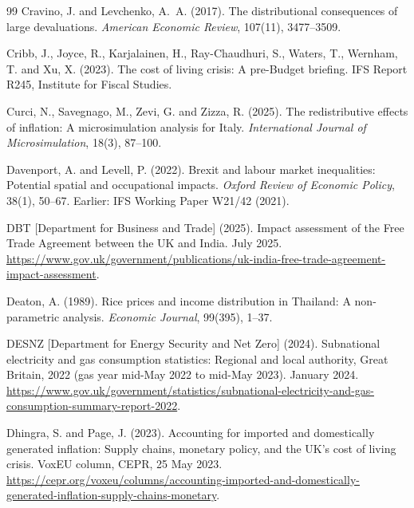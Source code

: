 \begin{thebibliography}{99}
Cravino, J. and Levchenko, A.~A. (2017).
\newblock The distributional consequences of large devaluations.
\newblock \emph{American Economic Review}, 107(11), 3477--3509.

Cribb, J., Joyce, R., Karjalainen, H., Ray-Chaudhuri, S., Waters, T., Wernham, T. and Xu, X. (2023).
\newblock The cost of living crisis: A pre-Budget briefing.
\newblock IFS Report R245, Institute for Fiscal Studies.

Curci, N., Savegnago, M., Zevi, G. and Zizza, R. (2025).
\newblock The redistributive effects of inflation: A microsimulation analysis for Italy.
\newblock \emph{International Journal of Microsimulation}, 18(3), 87--100.

Davenport, A. and Levell, P. (2022).
\newblock Brexit and labour market inequalities: Potential spatial and occupational impacts.
\newblock \emph{Oxford Review of Economic Policy}, 38(1), 50--67. Earlier: IFS Working Paper W21/42 (2021).

DBT [Department for Business and Trade] (2025).
\newblock Impact assessment of the Free Trade Agreement between the UK and India.
 July 2025. \url{https://www.gov.uk/government/publications/uk-india-free-trade-agreement-impact-assessment}.

Deaton, A. (1989).
\newblock Rice prices and income distribution in Thailand: A non-parametric analysis.
\newblock \emph{Economic Journal}, 99(395), 1--37.

DESNZ [Department for Energy Security and Net Zero] (2024).
\newblock Subnational electricity and gas consumption statistics: Regional and local authority, Great Britain, 2022 (gas year mid-May 2022 to mid-May 2023).
 January 2024. \url{https://www.gov.uk/government/statistics/subnational-electricity-and-gas-consumption-summary-report-2022}.

Dhingra, S. and Page, J. (2023).
\newblock Accounting for imported and domestically generated inflation: Supply chains, monetary policy, and the UK's cost of living crisis.
\newblock VoxEU column, CEPR, 25 May 2023. \url{https://cepr.org/voxeu/columns/accounting-imported-and-domestically-generated-inflation-supply-chains-monetary}.


\end{thebibliography}
